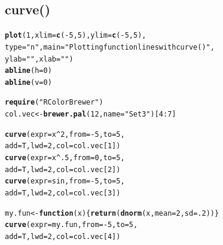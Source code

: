 \documentclass{tufte-book}\usepackage[]{graphicx}\usepackage[]{color}
\makeatletter
\newcommand{\hlnum}[1]{\textcolor[rgb]{0.686,0.059,0.569}{#1}}%
\newcommand{\hlstr}[1]{\textcolor[rgb]{0.192,0.494,0.8}{#1}}%
\newcommand{\hlopt}[1]{\textcolor[rgb]{0,0,0}{#1}}%
\newcommand{\hlstd}[1]{\textcolor[rgb]{0.345,0.345,0.345}{#1}}%
\newcommand{\hlkwa}[1]{\textcolor[rgb]{0.161,0.373,0.58}{\textbf{#1}}}%
\newcommand{\hlkwb}[1]{\textcolor[rgb]{0.69,0.353,0.396}{#1}}%
\newcommand{\hlkwc}[1]{\textcolor[rgb]{0.333,0.667,0.333}{#1}}%
\newcommand{\hlkwd}[1]{\textcolor[rgb]{0.737,0.353,0.396}{\textbf{#1}}}%
\newenvironment{kframe}{%
 \def\at@end@of@kframe{}%
 \ifinner\ifhmode%
  \def\at@end@of@kframe{\end{minipage}}%
  \begin{minipage}{\columnwidth}%
 \fi\fi%
 \def\FrameCommand##1{\hskip\@totalleftmargin \hskip-\fboxsep
 \colorbox{shadecolor}{##1}\hskip-\fboxsep
     \hskip-\linewidth \hskip-\@totalleftmargin \hskip\columnwidth}%
 \MakeFramed {\advance\hsize-\width
   \@totalleftmargin\z@ \linewidth\hsize
   \@setminipage}}%
 {\par\unskip\endMakeFramed%
 \at@end@of@kframe}
\newenvironment{knitrout}{}{} %
\makeatother
\begin{document}
\begin{footnotesize}
\subsection{curve()}

\begin{marginfigure}
\begin{tiny}
\begin{knitrout}
\color{fgcolor}\begin{kframe}
\begin{alltt}
\hlkwd{plot}\hlstd{(}\hlnum{1}\hlstd{,} \hlkwc{xlim} \hlstd{=} \hlkwd{c}\hlstd{(}\hlopt{-}\hlnum{5}\hlstd{,} \hlnum{5}\hlstd{),} \hlkwc{ylim} \hlstd{=} \hlkwd{c}\hlstd{(}\hlopt{-}\hlnum{5}\hlstd{,} \hlnum{5}\hlstd{),}
     \hlkwc{type} \hlstd{=} \hlstr{"n"}\hlstd{,} \hlkwc{main} \hlstd{=} \hlstr{"Plotting function lines with curve()"}\hlstd{,}
     \hlkwc{ylab} \hlstd{=} \hlstr{""}\hlstd{,} \hlkwc{xlab} \hlstd{=} \hlstr{""}\hlstd{)}
\hlkwd{abline}\hlstd{(}\hlkwc{h} \hlstd{=} \hlnum{0}\hlstd{)}
\hlkwd{abline}\hlstd{(}\hlkwc{v} \hlstd{=} \hlnum{0}\hlstd{)}

\hlkwd{require}\hlstd{(}\hlstr{"RColorBrewer"}\hlstd{)}
\hlstd{col.vec} \hlkwb{<-} \hlkwd{brewer.pal}\hlstd{(}\hlnum{12}\hlstd{,} \hlkwc{name} \hlstd{=} \hlstr{"Set3"}\hlstd{)[}\hlnum{4}\hlopt{:}\hlnum{7}\hlstd{]}

\hlkwd{curve}\hlstd{(}\hlkwc{expr} \hlstd{= x}\hlopt{^}\hlnum{2}\hlstd{,} \hlkwc{from} \hlstd{=} \hlopt{-}\hlnum{5}\hlstd{,} \hlkwc{to} \hlstd{=} \hlnum{5}\hlstd{,}
      \hlkwc{add} \hlstd{= T,} \hlkwc{lwd} \hlstd{=} \hlnum{2}\hlstd{,} \hlkwc{col} \hlstd{= col.vec[}\hlnum{1}\hlstd{])}
\hlkwd{curve}\hlstd{(}\hlkwc{expr} \hlstd{= x}\hlopt{^}\hlnum{.5}\hlstd{,} \hlkwc{from} \hlstd{=} \hlnum{0}\hlstd{,} \hlkwc{to} \hlstd{=} \hlnum{5}\hlstd{,}
      \hlkwc{add} \hlstd{= T,} \hlkwc{lwd} \hlstd{=} \hlnum{2}\hlstd{,} \hlkwc{col} \hlstd{= col.vec[}\hlnum{2}\hlstd{])}
\hlkwd{curve}\hlstd{(}\hlkwc{expr} \hlstd{= sin,} \hlkwc{from} \hlstd{=} \hlopt{-}\hlnum{5}\hlstd{,} \hlkwc{to} \hlstd{=} \hlnum{5}\hlstd{,}
      \hlkwc{add} \hlstd{= T,} \hlkwc{lwd} \hlstd{=} \hlnum{2}\hlstd{,} \hlkwc{col} \hlstd{= col.vec[}\hlnum{3}\hlstd{])}

\hlstd{my.fun} \hlkwb{<-} \hlkwa{function}\hlstd{(}\hlkwc{x}\hlstd{) \{}\hlkwd{return}\hlstd{(}\hlkwd{dnorm}\hlstd{(x,} \hlkwc{mean} \hlstd{=} \hlnum{2}\hlstd{,} \hlkwc{sd} \hlstd{=} \hlnum{.2}\hlstd{))\}}
\hlkwd{curve}\hlstd{(}\hlkwc{expr} \hlstd{= my.fun,} \hlkwc{from} \hlstd{=} \hlopt{-}\hlnum{5}\hlstd{,} \hlkwc{to} \hlstd{=} \hlnum{5}\hlstd{,}
      \hlkwc{add} \hlstd{= T,} \hlkwc{lwd} \hlstd{=} \hlnum{2}\hlstd{,} \hlkwc{col} \hlstd{= col.vec[}\hlnum{4}\hlstd{])}


\end{alltt}
\end{kframe}
\end{knitrout}
\end{tiny}
\end{marginfigure}
\end{footnotesize}
\end{document}
